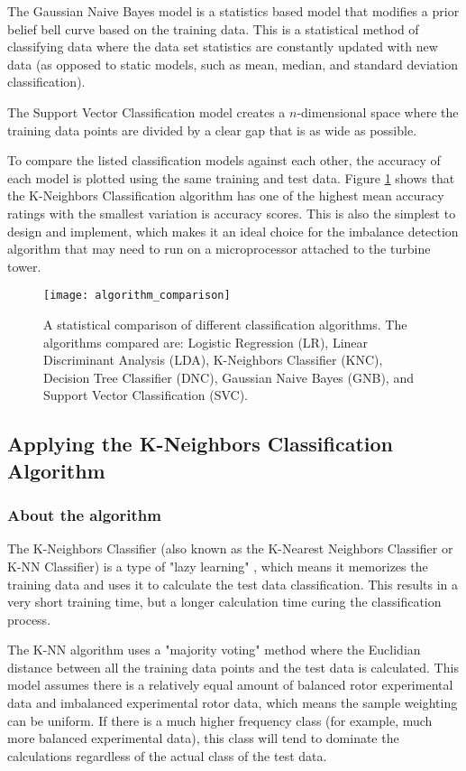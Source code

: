The Gaussian Naive Bayes model is a statistics based model that modifies a prior belief bell curve based on the training data.  This is a statistical method of classifying data where the data set statistics are constantly updated with new data (as opposed to static models, such as mean, median, and standard deviation classification).

The Support Vector Classification model creates a $n$-dimensional space where the training data points are divided by a clear gap that is as wide as possible.

To compare the listed classification models against each other, the accuracy of each model is plotted using the same training and test data.  Figure \ref{fig:algorithm_comparison} shows that the K-Neighbors Classification algorithm has one of the highest mean accuracy ratings with the smallest variation is accuracy scores.  This is also the simplest to design and implement, which makes it an ideal choice for the imbalance detection algorithm that may need to run on a microprocessor attached to the turbine tower.

\begin{figure}
	\centering
	\texttt{[image: algorithm\_comparison]}
	\decoRule
	\caption{A statistical comparison of different classification algorithms.  The algorithms compared are: Logistic Regression (LR), Linear Discriminant Analysis (LDA), K-Neighbors Classifier (KNC), Decision Tree Classifier (DNC), Gaussian Naive Bayes (GNB), and Support Vector Classification (SVC). }
	\label{fig:algorithm_comparison}
\end{figure}

\subsection{Applying the K-Neighbors Classification Algorithm}
\subsubsection{About the algorithm}
The K-Neighbors Classifier (also known as the K-Nearest Neighbors Classifier or K-NN Classifier) is a type of "lazy learning" \cite{k_NN_algorithm}, which means it memorizes the training data and uses it to calculate the test data classification.  This results in a very short training time, but a longer calculation time curing the classification process.


The K-NN algorithm uses a "majority voting" method where the Euclidian distance between all the training data points and the test data is calculated.  This model assumes there is a relatively equal amount of balanced rotor experimental data and imbalanced experimental rotor data, which means the sample weighting can be uniform.  If there is a much higher frequency class (for example, much more balanced experimental data), this class will tend to dominate the calculations regardless of the actual class of the test data.

